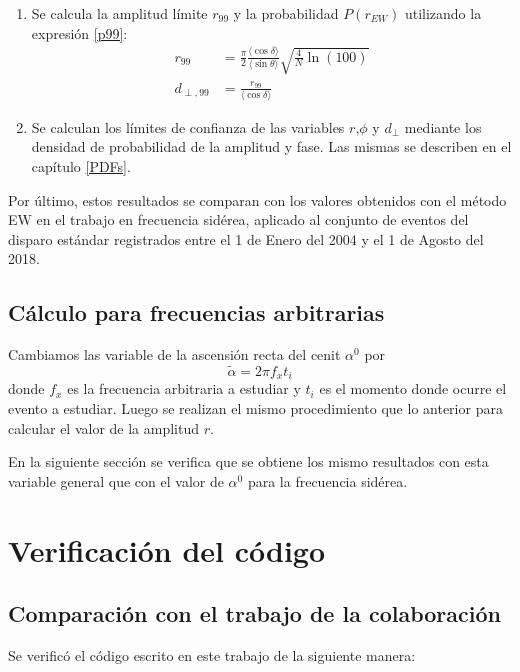 \begin{enumerate}
    \item Se calcula la amplitud límite $r_{99}$ y la probabilidad  $P(r_{EW})$ utilizando la expresión \ref{p99}:
    \begin{align*}
        r_{99} &= \frac{\pi}{2} \frac{\langle\cos\delta \rangle}{\langle\sin\theta \rangle}\sqrt{\frac{4}{N}\ln(100)}\\
        d_{\perp,99} &= \frac{r_{99}}{\langle\cos\delta \rangle}    
    \end{align*}

    \item Se calculan los límites de confianza de las variables $r$,$\phi$ y $d_\perp$ mediante los densidad de probabilidad de la amplitud y fase. Las mismas se describen en el capítulo \ref{PDFs}.


\end{enumerate}


Por último, estos resultados se comparan con los valores obtenidos con el método EW en el trabajo \cite{Aab_2020} en frecuencia sidérea, aplicado al conjunto de eventos del disparo estándar registrados entre el 1 de Enero del 2004 y el 1 de Agosto del 2018. 


\subsection{Cálculo para frecuencias  arbitrarias}

Cambiamos las variable de la ascensión recta del cenit $\alpha^0$ por
\begin{equation}
    \tilde{\alpha} = 2\pi f_x t_i  \label{ra_arb}
  \end{equation}
donde $f_x$ es la frecuencia arbitraria a estudiar y $t_i$ es el momento donde ocurre el evento a estudiar. Luego se realizan el mismo procedimiento que lo anterior para calcular el valor de la amplitud $r$.

En la siguiente sección se verifica que se obtiene los mismo resultados con esta variable general que con el valor de $\alpha^0$ para la frecuencia sidérea.

\section{Verificación del código}

\subsection{Comparación con el trabajo \cite{Aab_2020} de la colaboración}
Se verificó el código escrito en este trabajo de la siguiente manera:

